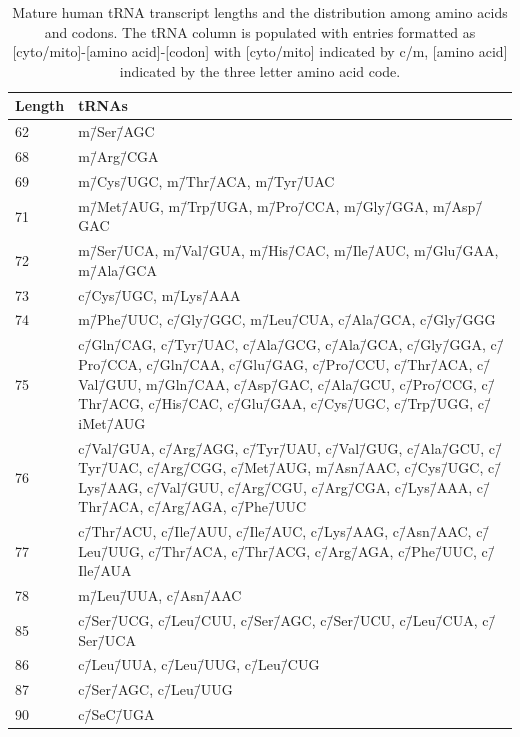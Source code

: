 \begin{table}[!htb]
\begin{tabular}{|l|p{}|}
\hline
Length & tRNAs \\ \hline
62     & m\=/Ser\=/AGC \\ \hline
68     & m\=/Arg\=/CGA \\ \hline
69     & m\=/Cys\=/UGC, m\=/Thr\=/ACA, m\=/Tyr\=/UAC \\ \hline
71     & m\=/Met\=/AUG, m\=/Trp\=/UGA, m\=/Pro\=/CCA, m\=/Gly\=/GGA, m\=/Asp\=/GAC \\ \hline
72     & m\=/Ser\=/UCA, m\=/Val\=/GUA, m\=/His\=/CAC, m\=/Ile\=/AUC, m\=/Glu\=/GAA, m\=/Ala\=/GCA \\ \hline
73     & c\=/Cys\=/UGC, m\=/Lys\=/AAA \\ \hline
74     & m\=/Phe\=/UUC, c\=/Gly\=/GGC, m\=/Leu\=/CUA, c\=/Ala\=/GCA, c\=/Gly\=/GGG \\ \hline
75     & c\=/Gln\=/CAG, c\=/Tyr\=/UAC, c\=/Ala\=/GCG, c\=/Ala\=/GCA, c\=/Gly\=/GGA, c\=/Pro\=/CCA,   c\=/Gln\=/CAA, c\=/Glu\=/GAG, c\=/Pro\=/CCU, c\=/Thr\=/ACA, c\=/Val\=/GUU, m\=/Gln\=/CAA, c\=/Asp\=/GAC,   c\=/Ala\=/GCU, c\=/Pro\=/CCG, c\=/Thr\=/ACG, c\=/His\=/CAC, c\=/Glu\=/GAA, c\=/Cys\=/UGC, c\=/Trp\=/UGG,   c\=/iMet\=/AUG \\ \hline
76     & c\=/Val\=/GUA, c\=/Arg\=/AGG, c\=/Tyr\=/UAU, c\=/Val\=/GUG, c\=/Ala\=/GCU, c\=/Tyr\=/UAC,   c\=/Arg\=/CGG, c\=/Met\=/AUG, m\=/Asn\=/AAC, c\=/Cys\=/UGC, c\=/Lys\=/AAG, c\=/Val\=/GUU, c\=/Arg\=/CGU,   c\=/Arg\=/CGA, c\=/Lys\=/AAA, c\=/Thr\=/ACA, c\=/Arg\=/AGA, c\=/Phe\=/UUC \\ \hline
77     & c\=/Thr\=/ACU, c\=/Ile\=/AUU, c\=/Ile\=/AUC, c\=/Lys\=/AAG, c\=/Asn\=/AAC, c\=/Leu\=/UUG,   c\=/Thr\=/ACA, c\=/Thr\=/ACG, c\=/Arg\=/AGA, c\=/Phe\=/UUC, c\=/Ile\=/AUA \\ \hline
78     & m\=/Leu\=/UUA, c\=/Asn\=/AAC \\ \hline
85     & c\=/Ser\=/UCG, c\=/Leu\=/CUU, c\=/Ser\=/AGC, c\=/Ser\=/UCU, c\=/Leu\=/CUA, c\=/Ser\=/UCA \\ \hline
86     & c\=/Leu\=/UUA, c\=/Leu\=/UUG, c\=/Leu\=/CUG \\ \hline
87     & c\=/Ser\=/AGC, c\=/Leu\=/UUG \\ \hline
90     & c\=/SeC\=/UGA \\ \hline
\end{tabular}
\caption[Length distribution of tRNAs.]{
    Mature human tRNA transcript lengths and the distribution among amino acids and codons. The tRNA column is populated with entries formatted as [cyto/mito]-[amino acid]-[codon] with [cyto/mito] indicated by c/m, [amino acid] indicated by the three letter amino acid code.
}
\end{table}
















